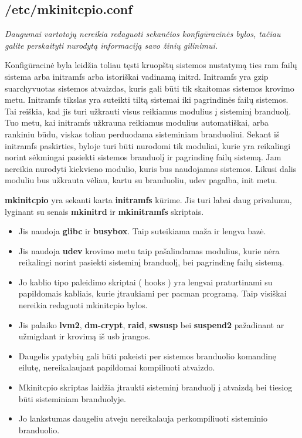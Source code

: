 \subsection{/etc/mkinitcpio.conf}

  \textsl{Daugumai vartotojų nereikia redaguoti sekančios konfigūracinės
    bylos, tačiau galite perskaityti nurodytą informaciją savo žinių
    gilinimui.}

  Konfigūracinė byla leidžia toliau tęsti kruopštų sistemos nustatymą
  ties ram failų sistema arba initramfs arba istoriškai vadinamą
  initrd. Initramfs yra gzip suarchyvuotas sistemos atvaizdas, kuris
  gali būti tik skaitomas sistemos krovimo metu. Initramfs tikslas yra
  suteikti tiltą sistemai iki pagrindinės failų sistemos. Tai reiškia,
  kad jis turi užkrauti visus reikiamus modulius į sisteminį
  branduolį. Tuo metu, kai initramfs užkrauna reikiamus modulius
  automatiškai, arba rankiniu būdu, viskas toliau perduodama
  sisteminiam branduoliui. Sekant iš initramfs paskirties, byloje turi
  būti nurodomi tik moduliai, kurie yra reikalingi norint sėkmingai
  pasiekti sistemos branduolį ir pagrindinę failų sistemą. Jam
  nereikia nurodyti kiekvieno modulio, kuris bus naudojamas
  sistemos. Likusi dalis moduliu bus užkrauta vėliau, kartu su
  branduoliu, udev pagalba, init metu. 

  \textbf{mkinitcpio} yra sekanti karta \textbf{initramfs} kūrime. Jis
  turi labai daug privalumu, lyginant su senais \textbf{mkinitrd} ir
  \textbf{mkinitramfs} skriptais.

  \begin{itemize}
    \item Jis naudoja \textbf{glibc} ir \textbf{busybox}. Taip
      suteikiama maža ir lengva bazė.
    \item Jis naudoja \textbf{udev} krovimo metu taip pašalindamas
      modulius, kurie nėra reikalingi norint pasiekti sisteminį
      branduolį, bei pagrindinę failų sistemą. 
    \item Jo kablio tipo paleidimo skriptai ( hooks ) yra lengvai praturtinami
      su papildomais kabliais, kurie įtraukiami per pacman
      programą. Taip visiškai nereikia redaguoti mkinitcpio bylos.
    \item Jis palaiko \textbf{lvm2}, \textbf{dm-crypt}, \textbf{raid},
      \textbf{swsusp} bei \textbf{suspend2} pažadinant ar užmigdant ir
      krovimą iš usb įrangos.
    \item Daugelis ypatybių gali būti pakeisti per sistemos branduolio
      komandinę eilutę, nereikalaujant papildomai kompiliuoti
      atvaizdo.
    \item Mkinitcpio skriptas laidžia įtraukti sisteminį branduolį į
      atvaizdą bei tiesiog būti sisteminiam branduolyje. 
    \item Jo lankstumas daugeliu atveju nereikalauja perkompiliuoti
      sisteminio branduolio.
  \end{itemize}


